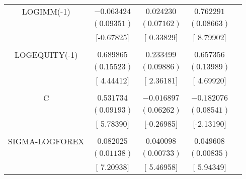 \begin{tabular}{lrrrr}
\multicolumn{1}{c}{LOGIMM(-1)}&\multicolumn{1}{c}{$-0.063424$}&\multicolumn{1}{c}{$0.024230$}&\multicolumn{1}{c}{$0.762291$}&\multicolumn{1}{c}{}\\
\multicolumn{1}{c}{}&\multicolumn{1}{c}{$(0.09351)$}&\multicolumn{1}{c}{$(0.07162)$}&\multicolumn{1}{c}{$(0.08663)$}&\multicolumn{1}{c}{}\\
\multicolumn{1}{c}{}&\multicolumn{1}{c}{[-0.67825]}&\multicolumn{1}{c}{[ 0.33829]}&\multicolumn{1}{c}{[ 8.79902]}&\multicolumn{1}{c}{}\\
\multicolumn{1}{c}{}&\multicolumn{1}{c}{}&\multicolumn{1}{c}{}&\multicolumn{1}{c}{}&\multicolumn{1}{c}{}\\
\multicolumn{1}{c}{LOGEQUITY(-1)}&\multicolumn{1}{c}{$0.689865$}&\multicolumn{1}{c}{$0.233499$}&\multicolumn{1}{c}{$0.657356$}&\multicolumn{1}{c}{}\\
\multicolumn{1}{c}{}&\multicolumn{1}{c}{$(0.15523)$}&\multicolumn{1}{c}{$(0.09886)$}&\multicolumn{1}{c}{$(0.13989)$}&\multicolumn{1}{c}{}\\
\multicolumn{1}{c}{}&\multicolumn{1}{c}{[ 4.44412]}&\multicolumn{1}{c}{[ 2.36181]}&\multicolumn{1}{c}{[ 4.69920]}&\multicolumn{1}{c}{}\\
\multicolumn{1}{c}{}&\multicolumn{1}{c}{}&\multicolumn{1}{c}{}&\multicolumn{1}{c}{}&\multicolumn{1}{c}{}\\
\multicolumn{1}{c}{C}&\multicolumn{1}{c}{$0.531734$}&\multicolumn{1}{c}{$-0.016897$}&\multicolumn{1}{c}{$-0.182076$}&\multicolumn{1}{c}{}\\
\multicolumn{1}{c}{}&\multicolumn{1}{c}{$(0.09193)$}&\multicolumn{1}{c}{$(0.06262)$}&\multicolumn{1}{c}{$(0.08541)$}&\multicolumn{1}{c}{}\\
\multicolumn{1}{c}{}&\multicolumn{1}{c}{[ 5.78390]}&\multicolumn{1}{c}{[-0.26985]}&\multicolumn{1}{c}{[-2.13190]}&\multicolumn{1}{c}{}\\
\multicolumn{1}{c}{}&\multicolumn{1}{c}{}&\multicolumn{1}{c}{}&\multicolumn{1}{c}{}&\multicolumn{1}{c}{}\\
\multicolumn{1}{c}{SIGMA-LOGFOREX}&\multicolumn{1}{c}{$0.082025$}&\multicolumn{1}{c}{$0.040098$}&\multicolumn{1}{c}{$0.049608$}&\multicolumn{1}{c}{}\\
\multicolumn{1}{c}{}&\multicolumn{1}{c}{$(0.01138)$}&\multicolumn{1}{c}{$(0.00733)$}&\multicolumn{1}{c}{$(0.00835)$}&\multicolumn{1}{c}{}\\
\multicolumn{1}{c}{}&\multicolumn{1}{c}{[ 7.20938]}&\multicolumn{1}{c}{[ 5.46958]}&\multicolumn{1}{c}{[ 5.94349]}&\multicolumn{1}{c}{}\\

\end{tabular}
